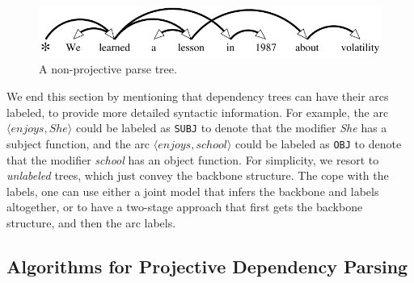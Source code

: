 \begin{figure}
\begin{center}
    \includegraphics[width=1\columnwidth]{figs/parsing/example_nonproj}
  \caption{A non-projective parse tree.}
  \label{fig:deptree_nonproj}
  \end{center}
\end{figure}

We end this section by mentioning that dependency trees can have their arcs labeled, to provide more detailed syntactic information. 
For example, the arc $\langle enjoys, She \rangle$ could be labeled as {\tt SUBJ} to denote that the modifier \emph{She} has a subject function, and 
the arc $\langle enjoys, school \rangle$ could be labeled as {\tt OBJ} to denote that the modifier \emph{school} has an object function. 
For simplicity, we resort to \emph{unlabeled} trees, which just convey the backbone structure. The cope with the labels, one can use either a joint model 
that infers the backbone and labels altogether, or to have a two-stage approach that first gets the backbone structure, and then the arc labels. 

\subsection{Algorithms for Projective Dependency Parsing}

